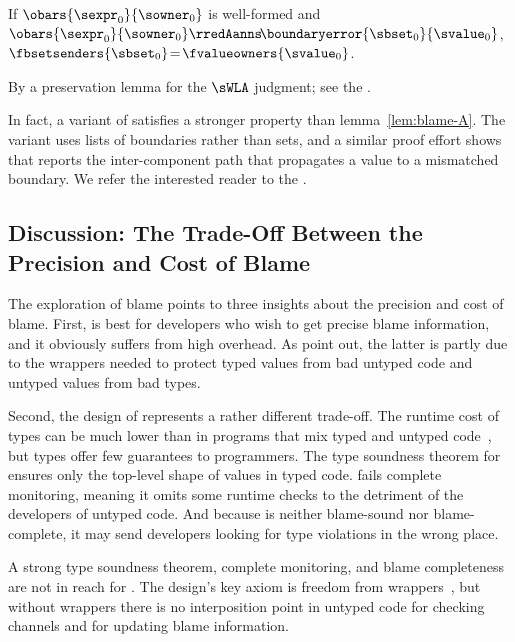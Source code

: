 \begin{lemma}\label{lem:blame-A}
  If\/ $\obars{\sexpr_0}{\sowner_0}$
  is well-formed and\/ $\obars{\sexpr_0}{\sowner_0} \rredAanns\!\boundaryerror{\sbset_0}{\svalue_0}$,
  $\fbsetsenders{\sbset_0}\!=\!\fvalueowners{\svalue_0}$.
\end{lemma}
\begin{proofsketch}
  By a preservation lemma for the $\sWLA$ judgment; see the \techreport{}.
\end{proofsketch}

In fact, a variant of \Aname{} satisfies a stronger property than
lemma~\ref{lem:blame-A}.  The variant uses lists of boundaries rather than
sets, and a similar proof effort shows that \Aname{} reports the
inter-component path that propagates a value to a mismatched boundary. We 
refer the interested reader to the \techreport{}.

\subsection{Discussion: The Trade-Off Between the Precision and Cost of Blame} 
\label{sec:tradeoff}

The exploration of blame points to three insights about the precision and
cost of blame.
First, \Nname{} is best for developers who wish to get
precise blame information, and it obviously suffers from high overhead.
As \citet{gt-dead-ben} point out, the latter is partly due to the wrappers
needed to protect typed values from bad untyped code and untyped values
from bad types.


Second, the design of \Tname{} represents a rather different trade-off.
The runtime cost of types can be much lower than \Nname{} in programs that mix
typed and untyped code~\cite{gf-icfp-2018}, but \Tname{} types offer few
guarantees to programmers.
The type soundness theorem for \Tname{} ensures only the top-level shape of
values in typed code.
\Tname{} fails complete monitoring, meaning it omits some runtime checks
to the detriment of the developers of untyped code.
And because \Tname{} is neither blame-sound nor blame-complete, it may send developers
looking for type violations in the wrong place.

A strong type soundness theorem, complete monitoring, and blame
completeness are not in reach for \Tname{}.  The design's key axiom is
freedom from wrappers~\cite{vss-popl-2017}, but without wrappers there is
no interposition point in untyped code for checking channels and for updating
blame information.

